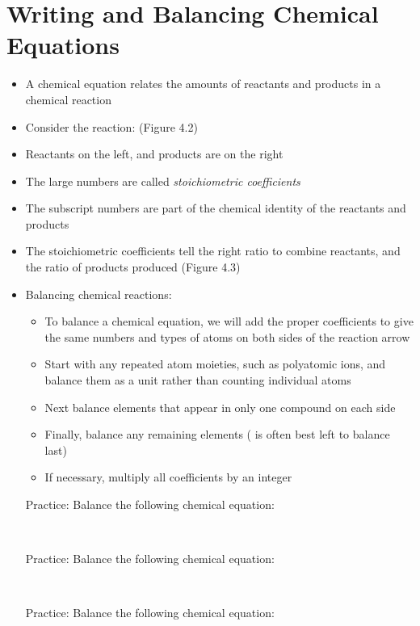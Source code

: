 \documentclass[12pt, openany, letterpaper]{memoir}
\begin{document}
\section{Writing and Balancing Chemical Equations}
\begin{itemize}
  \item A chemical equation relates the amounts of reactants and products in a chemical reaction
  \item Consider the reaction:  (Figure 4.2)
  \item Reactants on the left, and products are on the right
  \item The large numbers are called \emph{stoichiometric coefficients}
  \item The subscript numbers are part of the chemical identity of the reactants and products
  \item The stoichiometric coefficients tell the right ratio to combine reactants, and the ratio of products produced (Figure 4.3)
  \item Balancing chemical reactions:
    \begin{itemize}
      \item To balance a chemical equation, we will add the proper coefficients to give the same numbers and types of atoms on both sides of the reaction arrow
      \item Start with any repeated atom moieties, such as polyatomic ions, and balance them as a unit rather than counting individual atoms
      \item Next balance elements that appear in only one compound on each side
      \item Finally, balance any remaining elements ( is often best left to balance last)
      \item If necessary, multiply all coefficients by an integer
    \end{itemize}
  Practice: Balance the following chemical equation: 

  ~\hphantom{Practice:} 

  Practice: Balance the following chemical equation: 

  ~\hphantom{Practice:} 

  Practice: Balance the following chemical equation: 


\end{itemize}
\end{document}
